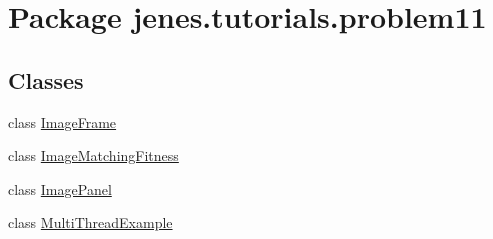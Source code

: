 \hypertarget{namespacejenes_1_1tutorials_1_1problem11}{\section{Package jenes.\-tutorials.\-problem11}
\label{namespacejenes_1_1tutorials_1_1problem11}
}
\subsection*{Classes}
\begin{DoxyCompactItemize}
\item 
class \hyperlink{classjenes_1_1tutorials_1_1problem11_1_1_image_frame}{Image\-Frame}
\item 
class \hyperlink{classjenes_1_1tutorials_1_1problem11_1_1_image_matching_fitness}{Image\-Matching\-Fitness}
\item 
class \hyperlink{classjenes_1_1tutorials_1_1problem11_1_1_image_panel}{Image\-Panel}
\item 
class \hyperlink{classjenes_1_1tutorials_1_1problem11_1_1_multi_thread_example}{Multi\-Thread\-Example}
\end{DoxyCompactItemize}
